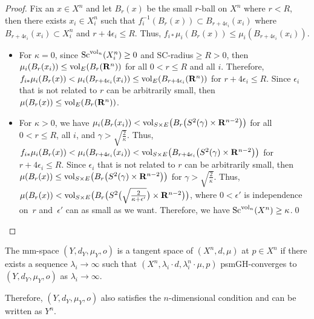 \documentclass[pdftex]{sigma}
\begin{document}
\begin{proof}
Fix an $x\in X^n$ and let $B_r(x)$ be the small $r$-ball on $X^n$ where $r < R$, then there exists $x_i\in X^n_i$ such that $f^{-1}_i(B_r(x))\subset B_{r+4\epsilon_i}(x_i) $ where $B_{r+4\epsilon_i}(x_i) \subset X^n_i$ and $r+4\epsilon_i\leq R$. Thus, $f_{i*}\mu_i(B_r(x))\leq \mu_i(B_{r+4\epsilon_i}(x_i))$.
\begin{itemize}\itemsep=0pt
\item For $\kappa=0$, since ${\rm Sc}^{{\rm vol}_n}(X^n_i)\geq 0$ and SC-radius$\geq R>0$, then $\mu_i(B_r(x_i))\leq {\rm vol}_E(B_r(\mathbf{R}^n))$ for all $0<r \leq R$ and all $i$. Therefore, $f_{i*}\mu_i(B_r(x))< \mu_i(B_{r+4\epsilon_i}(x_i))\leq {\rm vol}_E(B_{r+4\epsilon_i}(\mathbf{R}^n))$ for $r+4\epsilon_i\leq R$. Since $\epsilon_i$ that is not related to $r$ can be arbitrarily small, then $\mu(B_r(x))\leq {\rm vol}_E(B_r(\mathbf{R}^n))$.
\item For $\kappa>0$, we have $\mu_i(B_r(x_i))< {\rm vol}_{S \times E} \big(B_r \big(S^2(\gamma)\times \mathbf{R}^{n-2} \big) \big)$ for all $0< r \leq R$, all $i$, and $\gamma>\sqrt{\frac{2}{\kappa}}$. Thus, $f_{i*}\mu_i(B_r(x))< \mu_i(B_{r+4\epsilon_i}(x_i))< {\rm vol}_{S\times E} \big(B_{r+4\epsilon_i} \big(S^2(\gamma)\times \mathbf{R}^{n-2} \big) \big)$ for $r+4\epsilon_i\leq R$. Since $\epsilon_i$ that is not related to $r$ can be arbitrarily small, then $\mu(B_r(x))\leq {\rm vol}_{S\times E} \big(B_{r} \big(S^2(\gamma)\times \mathbf{R}^{n-2} \big) \big)$ for $\gamma>\sqrt{\frac{2}{\kappa}}$. Thus, $\mu(B_r(x))< {\rm vol}_{S\times E} \big(B_{r} \big(S^2\big(\sqrt{\frac{2}{\kappa+\epsilon'}}\big)\times \mathbf{R}^{n-2} \big) \big)$, where $0<\epsilon'$ is independence on~$r$ and~$\epsilon'$ can as small as we want. Therefore, we have ${\rm Sc}^{{\rm vol}_n}(X^n)\geq \kappa$.\hfill\qed
\end{itemize}\renewcommand{\qed}{}
\end{proof}

\begin{Definition}
The mm-space $(Y,d_Y,\mu_Y, o)$ is a tangent space of $(X^n,d,\mu)$ at $p\in X^n$ if there exists a sequence $\lambda_i\to \infty$ such that $(X^n,\lambda_i\cdot d,\lambda_i^n \cdot\mu,p)$ psmGH-converges to $(Y,d_Y,\mu_Y, o)$ as $\lambda_i\to \infty$.
\end{Definition}

Therefore, $(Y,d_Y,\mu_Y, o)$ also satisfies the $n$-dimensional condition and can be written as $Y^n$.
\end{document}
